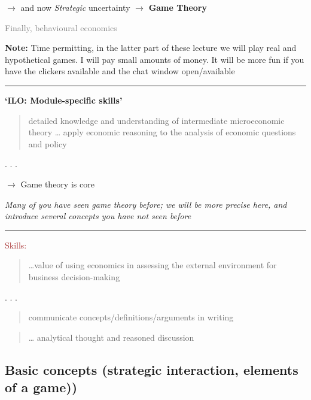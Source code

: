 \documentclass[]{article}
\begin{document}
\(\rightarrow\) and now \emph{Strategic} uncertainty \(\rightarrow\) \textbf{Game Theory}

\textcolor{gray}{Finally, behavioural economics}

\textbf{Note:} Time permitting, in the latter part of these lecture we will play real and hypothetical games. I will pay small amounts of money. It will be more fun if you have the clickers available and the chat window open/available

\begin{center}\rule{0.5\linewidth}{\linethickness}\end{center}

\textbf{`ILO: Module-specific skills'}

\begin{quote}
detailed knowledge and understanding of intermediate microeconomic theory \ldots{}
apply economic reasoning to the analysis of economic questions and policy
\end{quote}

. . .

\(\rightarrow\) Game theory is core

\emph{Many of you have seen game theory before; we will be more precise here, and introduce several concepts you have not seen before}

\begin{center}\rule{0.5\linewidth}{\linethickness}\end{center}

\textcolor{brown}{Skills:}

\bigskip

\begin{quote}
\ldots{}value of using economics in assessing the external environment for business decision-making
\end{quote}

. . .

\begin{quote}
communicate concepts/definitions/arguments in writing
\end{quote}

\begin{quote}
\ldots{} analytical thought and reasoned discussion
\end{quote}

\hypertarget{basic-concepts-strategic-interaction-elements-of-a-game}{%
\subsection{Basic concepts (strategic interaction, elements of a game))}\label{basic-concepts-strategic-interaction-elements-of-a-game}}
\end{document}
